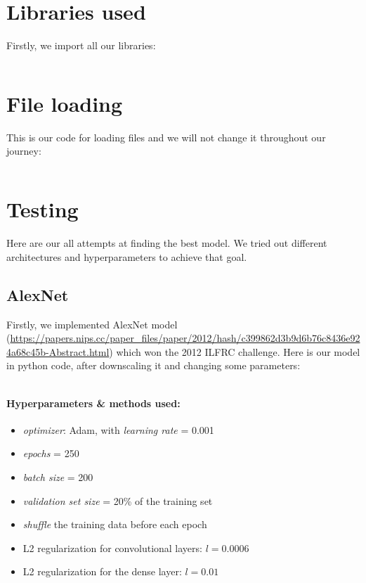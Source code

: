 \documentclass[12pt]{article}
\begin{document}
  \section{Libraries used}
    Firstly, we import all our libraries:
    \inputminted[linenos]{python}{code/imports.py}
  \section{File loading}
    This is our code for loading files and we will not change it throughout our journey:
    \inputminted[linenos]{python}{code/loading.py}
  \section{Testing}
    Here are our all attempts at finding the best model. We tried out different architectures and hyperparameters to achieve that goal.
    \subsection{AlexNet}
      Firstly, we implemented AlexNet model (\url{https://papers.nips.cc/paper_files/paper/2012/hash/c399862d3b9d6b76c8436e924a68c45b-Abstract.html})
      which won the 2012 ILFRC challenge. Here is our model in python code, after downscaling it and changing some parameters:
      \inputminted[linenos]{python}{code/alexnet.py}
      \paragraph{Hyperparameters \& methods used:}
        \begin{itemize}
          \item \textit{optimizer}: Adam, with \textit{learning rate} = 0.001
          \item \textit{epochs} = 250
          \item \textit{batch size} = 200
          \item \textit{validation set size} = 20\% of the training set
          \item \textit{shuffle} the training data before each epoch
          \item L2 regularization for convolutional layers: $l = 0.0006$
          \item L2 regularization for the dense layer: $l = 0.01$
        \end{itemize}
\end{document}
